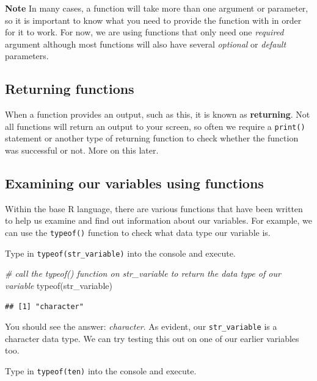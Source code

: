 \documentclass[
]{book}
\newenvironment{Shaded}{\begin{snugshade}}{\end{snugshade}}
\newcommand{\CommentTok}[1]{\textcolor[rgb]{0.56,0.35,0.01}{\textit{#1}}}
\newcommand{\FunctionTok}[1]{\textcolor[rgb]{0.00,0.00,0.00}{#1}}
\newcommand{\NormalTok}[1]{#1}
\begin{document}
\textbf{Note}
In many cases, a function will take more than one argument or parameter, so it is important to know what you need to provide the function with in order for it to work. For now, we are using functions that only need one \emph{required} argument although most functions will also have several \emph{optional} or \emph{default} parameters.

\hypertarget{returning-functions}{%
\subsection{Returning functions}\label{returning-functions}}

When a function provides an output, such as this, it is known as \textbf{returning}. Not all functions will return an output to your screen, so often we require a \texttt{print()} statement or another type of returning function to check whether the function was successful or not. More on this later.

\hypertarget{examining-our-variables-using-functions}{%
\subsection{Examining our variables using functions}\label{examining-our-variables-using-functions}}

Within the base R language, there are various functions that have been written to help us examine and find out information about our variables. For example, we can use the \texttt{typeof()} function to check what data type our variable is.

Type in \texttt{typeof(str\_variable)} into the console and execute.

\begin{Shaded}
\begin{Highlighting}[]
\CommentTok{\# call the typeof() function on str\_variable to return the data type of our variable}
\FunctionTok{typeof}\NormalTok{(str\_variable)}
\end{Highlighting}
\end{Shaded}

\begin{verbatim}
## [1] "character"
\end{verbatim}

You should see the answer: \emph{character}. As evident, our \texttt{str\_variable} is a character data type. We can try testing this out on one of our earlier variables too.

Type in \texttt{typeof(ten)} into the console and execute.
\end{document}
